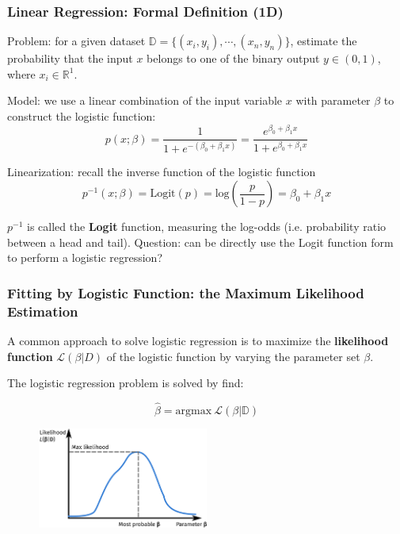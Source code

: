 \documentclass[10pt,aspectratio=169]{beamer}
\begin{document}
\begin{frame}
\begin{columns}[T]
\begin{column}{0.5\textwidth}
      \end{column}
      
    \end{columns}
  \end{frame}

  \begin{frame}
    \frametitle{Linear Regression: Formal Definition (1D)}
    Problem: for a given dataset
    $\mathbb{D} = \{(x_{i}, y_{i}), \cdots, (x_{n}, y_{n})\}$,
    estimate the probability that the input $x$ belongs to one of the
    binary output $y \in (0, 1)$, where $x_{i} \in \mathbb{R}^{1}$.

    \vfill Model: we use a linear combination of the input variable
    $x$ with parameter $\beta$ to construct the logistic function:
    \begin{equation*}
      p(x; \beta) = \dfrac{1}{1 + e^{-(\beta_{0} + \beta_{1} x)}} = \dfrac{e^{\beta_{0} + \beta_{1} x}}{1 + e^{\beta_{0} + \beta_{1} x}}
    \end{equation*}

    \vfill Linearization: recall the inverse function of the logistic
    function
    \begin{equation*}
      p^{-1}(x; \beta) = \mathrm{Logit}(p) = \mathrm{log} (\dfrac{p}{1 - p} ) = \beta_{0} + \beta_{1} x
    \end{equation*}

    $p^{-1}$ is called the \textbf{Logit} function, measuring the
    log-odds (i.e. probability ratio between a head and tail).  \vfill
    Question: can be directly use the Logit function form to perform a
    logistic regression?
  
  \end{frame}
  

  \begin{frame}
    \frametitle{Fitting by Logistic Function: the Maximum Likelihood
      Estimation}

    A common approach to solve logistic regression is to maximize the
    \textbf{likelihood function} $\mathscr{L}(\beta|D)$ of the
    logistic function by varying the parameter set $\beta$.

    The logistic regression problem is solved by find:

    \begin{equation*}
      \hat{\beta} = \mathrm{argmax}\ \mathscr{L}(\beta|\mathbb{D})
    \end{equation*}
    
         \begin{figure}[t]
           \includegraphics[width=0.5\textwidth]{images/likelihood.pdf}
         \end{figure}

    
       \end{frame}
\end{document}
